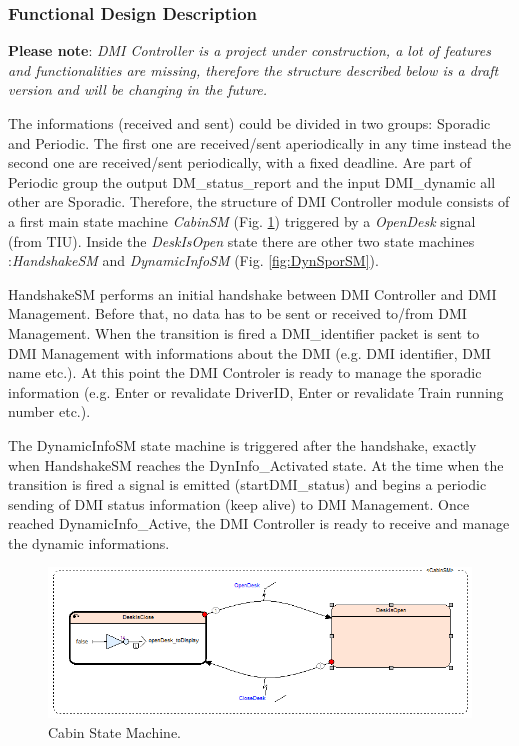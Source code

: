 \subsubsection{Functional Design Description}
  \textbf{Please note}: \textit{DMI Controller is a project under construction, a lot of features and functionalities are missing, therefore the structure described below is a draft version and will be changing in the future.}
  
  The informations (received and sent) could be divided in two groups: Sporadic and Periodic. The first one are received/sent aperiodically in any time instead the second one are received/sent periodically, with a fixed deadline. Are part of Periodic group the output DM\_status\_report and the input DMI\_dynamic all other are Sporadic. Therefore, the structure of DMI Controller module consists of a first main state machine \textit{CabinSM} (Fig. \ref{fig:CabinSM}) triggered by  a \textit{OpenDesk} signal (from TIU). Inside the \textit{DeskIsOpen} state there are other two state machines :\textit{HandshakeSM} and \textit{DynamicInfoSM} (Fig. \ref{fig:DynSporSM}).
  
  HandshakeSM performs an initial handshake between DMI Controller and DMI Management. Before that, no data has to be sent or received to/from DMI Management. When the transition is fired a DMI\_identifier packet is sent to DMI Management with informations about the DMI (e.g. DMI identifier, DMI name etc.). At this point the DMI Controler is ready to manage the sporadic information (e.g. Enter or revalidate DriverID, Enter or revalidate Train running number etc.). 
  
  The DynamicInfoSM state machine is triggered after the handshake, exactly when  HandshakeSM reaches the  DynInfo\_Activated state. At the time when the transition is fired a signal is emitted (startDMI\_status) and begins a periodic sending of DMI status information (keep alive) to DMI Management. Once reached DynamicInfo\_Active, the DMI Controller is ready to receive and manage the dynamic informations.
  
   \begin{figure} 
      	\centering
      	\includegraphics[scale=0.7]{images/CabinSM}
      	\caption{Cabin State Machine.}
      	\label{fig:CabinSM}
   \end{figure}
      
